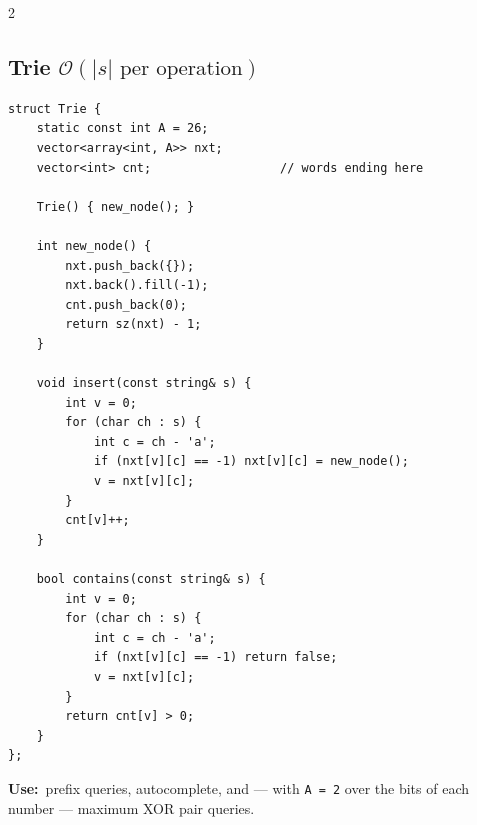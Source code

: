 \documentclass[10pt]{article}
\newcommand{\code}[1]{\texttt{\small #1}}
\newcommand{\sub}[2]{\subsection[#1]{#1\hspace{0.6em}%
  \textnormal{\color{accent2}\small$\mathcal{O}(#2)$}}}
\newcommand{\uses}[1]{{\color{accent2}\footnotesize\textbf{Use:}}~{\footnotesize #1}\par}
\begin{document}
\begin{multicols}{2}
\sub{Trie}{|s| \text{ per operation}}
\begin{lstlisting}
struct Trie {
    static const int A = 26;
    vector<array<int, A>> nxt;
    vector<int> cnt;                  // words ending here

    Trie() { new_node(); }

    int new_node() {
        nxt.push_back({});
        nxt.back().fill(-1);
        cnt.push_back(0);
        return sz(nxt) - 1;
    }

    void insert(const string& s) {
        int v = 0;
        for (char ch : s) {
            int c = ch - 'a';
            if (nxt[v][c] == -1) nxt[v][c] = new_node();
            v = nxt[v][c];
        }
        cnt[v]++;
    }

    bool contains(const string& s) {
        int v = 0;
        for (char ch : s) {
            int c = ch - 'a';
            if (nxt[v][c] == -1) return false;
            v = nxt[v][c];
        }
        return cnt[v] > 0;
    }
};
\end{lstlisting}
\uses{prefix queries, autocomplete, and --- with \code{A = 2} over the
bits of each number --- maximum XOR pair queries.}

\end{multicols}

\end{document}
